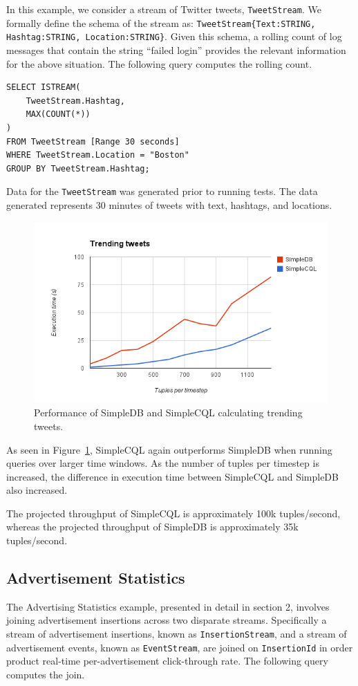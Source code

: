 \documentclass[a4paper, 10pt, conference]{IEEEconf}
\begin{document}
In this example, we consider a stream of Twitter tweets, \texttt{TweetStream}. We formally define the schema of the stream as: \texttt{TweetStream\{Text:STRING, Hashtag:STRING, Location:STRING\}}.  Given this schema, a rolling count of log messages that contain the string ``failed login'' provides the relevant information for the above situation.  The following query computes the rolling count.

\begin{lstlisting}
SELECT ISTREAM(
    TweetStream.Hashtag,
    MAX(COUNT(*))
)
FROM TweetStream [Range 30 seconds]
WHERE TweetStream.Location = "Boston"
GROUP BY TweetStream.Hashtag;
\end{lstlisting}

Data for the \texttt{TweetStream} was generated prior to running tests.  The data generated represents 30 minutes of tweets with text, hashtags, and locations.   

\begin{figure}[h!]
    \centering
    \centerline{\includegraphics[totalheight=5cm]{trending.png}}
    \caption{Performance of SimpleDB and SimpleCQL calculating trending tweets.}
    \label{fig:trending}
\end{figure}

As seen in Figure~\ref{fig:trending}, SimpleCQL again outperforms SimpleDB when running queries over larger time windows.  As the number of tuples per timestep is increased, the difference in execution time between SimpleCQL and SimpleDB also increased.

The projected throughput of SimpleCQL is approximately 100k tuples/second, whereas the projected throughput of SimpleDB is approximately 35k tuples/second.

\subsection{Advertisement Statistics}
The Advertising Statistics example, presented in detail in section 2, involves joining advertisement insertions across two disparate streams.  Specifically a stream of advertisement insertions, known as \texttt{InsertionStream}, and a stream of advertisement events, known as \texttt{EventStream}, are joined on \texttt{InsertionId} in order product real-time per-advertisement click-through rate.  The following query computes the join.
\end{document}
